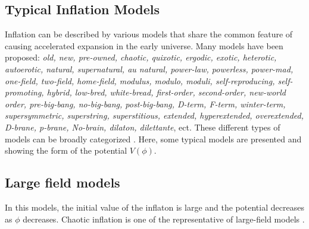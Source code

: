 \documentclass[12pt]{article}
\numberwithin{equation}{section}
\begin{document}
\subsection{Typical Inflation Models}
Inflation can be described by various models that share the common feature of causing accelerated expansion in the early universe. Many models have been proposed: \textit{old, new, pre-owned, chaotic, quixotic, ergodic, exotic, heterotic, autoerotic, natural, supernatural, au natural, power-law, powerless, power-mad, one-field, two-field, home-field, modulus, modulo, moduli, self-reproducing, self-promoting, hybrid, low-bred, white-bread, first-order, second-order, new-world order, pre-big-bang, no-big-bang, post-big-bang, D-term, F-term, winter-term, supersymmetric, superstring, superstitious, extended, hyperextended, overextended, D-brane, p-brane, No-brain, dilaton, dilettante}, ect. These different types of models can be broadly categorized \cite{Kolb:1999ar}. Here, some typical models are presented and showing the form of the potential $V(\phi)$.
\subsection*{Large field models}
In this models, the initial value of the inflaton is large and the potential decreases as $\phi$ decreases. Chaotic inflation is one of the representative of large-field models \cite{Linde:1983gd}.
\end{document}
